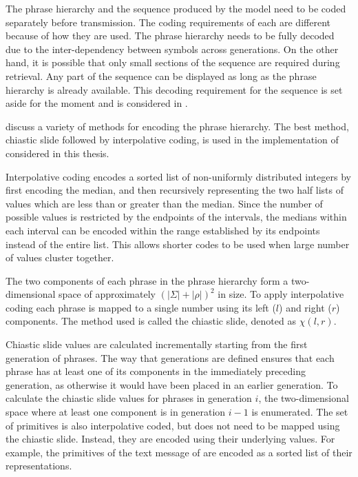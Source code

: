 
The phrase hierarchy and the sequence produced by the \repair 
model need to be coded separately before transmission.  The 
coding requirements of each are different because of how they are 
used.  The phrase hierarchy needs to be fully 
decoded due to the inter-dependency between symbols across
generations.  On the other hand, it is possible that only
small sections of the sequence are
required during retrieval.  Any part of the sequence can be
displayed as long as the phrase hierarchy is already available.  
This decoding requirement for the sequence is set aside for the 
moment and is considered in .


\citet{lm00:procieee} discuss a variety of methods for encoding 
the phrase hierarchy.  The best method, chiastic slide followed 
by interpolative coding, is used in the implementation 
of \repair considered in this thesis.

Interpolative coding \citep{ms00:ir} encodes a sorted list
of non-uniformly distributed integers by first encoding the 
median, and then recursively representing the 
two half lists of values which are less than or
greater than the median.  Since
the number of possible values is restricted by the endpoints of 
the intervals, the medians within each interval can be encoded within the range established by its endpoints instead of the entire list.  This allows 
shorter codes to be used when large number of values cluster 
together.

The two components of each phrase in the phrase hierarchy form
a two-dimensional space of approximately 
$(|\Sigma| + |\rho|)^2$ in size.  To apply
interpolative coding each phrase is mapped to a single number using its
left ($l$) and right ($r$) components.  The method used
is called the chiastic slide, denoted as $\chi(l,r)$.

Chiastic slide values are calculated incrementally starting from
the first generation of phrases.  The way that
generations are defined ensures that each phrase has
at least one of its components in the immediately preceding
generation, as otherwise it would have been placed in an earlier
generation.  To calculate the chiastic slide values for
phrases in generation $i$, the two-dimensional space 
where at least one component is in generation $i - 1$ is 
enumerated.  The set of primitives is also interpolative 
coded, but does not need to be mapped using the chiastic 
slide.  Instead, they are encoded using their underlying values.
For example, the primitives of the text 
message of  are encoded as a sorted
list of their \eascii representations.

